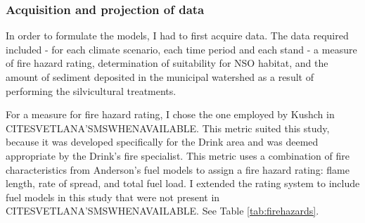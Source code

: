 \subsubsection{Acquisition and projection of data}
In order to formulate the models, I had to first acquire data. The data required included - for each climate scenario, each time period and each stand - a measure of fire hazard rating, determination of suitability for NSO habitat, and the amount of sediment deposited in the municipal watershed as a result of performing the silvicultural treatments.

For a measure for fire hazard rating, I chose the one employed by Kushch in CITESVETLANA'SMSWHENAVAILABLE. This metric suited this study, because it was developed specifically for the Drink area and was deemed appropriate by the Drink's fire specialist. This metric uses a combination of fire characteristics from Anderson's fuel models \cite{anderson1982aids} to assign a fire hazard rating: flame length, rate of spread, and total fuel load. I extended the rating system to include fuel models in this study that were not present in CITESVETLANA'SMSWHENAVAILABLE. See Table \ref{tab:firehazards}.

